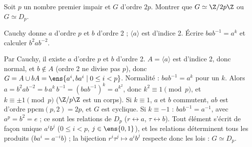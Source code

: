 \begin{exo}
Soit $p$ un nombre premier impair et $G$ d'ordre $2p$. Montrer que $G\simeq\Z/2p\Z$ ou $G\simeq D_p$.
\begin{indication}
Cauchy donne $a$ d'ordre $p$ et $b$ d'ordre 2 ; $\langle a\rangle$ est d'indice 2. Écrire $bab^{-1}=a^k$ et calculer $b^2ab^{-2}$.
\end{indication}
\begin{corrige}
Par Cauchy, il existe $a$ d'ordre $p$ et $b$ d'ordre 2. $A=\langle a\rangle$ est d'indice 2, donc normal, et $b\notin A$ (ordre 2 ne divise pas $p$), donc $G=A\cup bA=\ens{a^i,ba^i\mid 0\le i<p}$. Normalité : $bab^{-1}=a^k$ pour un $k$. Alors $a=b^2ab^{-2}=b\,a^k\,b^{-1}=(bab^{-1})^k=a^{k^2}$, donc $k^2\equiv1\pmod p$, et $k\equiv\pm1\pmod p$ ($\Z/p\Z$ est un corps). Si $k\equiv1$, $a$ et $b$ commutent, $ab$ est d'ordre $\mathrm{ppcm}(p,2)=2p$, et $G$ est cyclique. Si $k\equiv-1$ : $bab^{-1}=a^{-1}$, avec $a^p=b^2=e$ ; ce sont les relations de $D_p$ ($r\leftrightarrow a$, $\tau\leftrightarrow b$). Tout élément s'écrit de façon unique $a^ib^j$ ($0\le i<p$, $j\in\ens{0,1}$), et les relations déterminent tous les produits ($b a^i=a^{-i}b$) ; la bijection $r^i\tau^j\mapsto a^ib^j$ respecte donc les lois : $G\simeq D_p$.
\end{corrige}
\end{exo}

